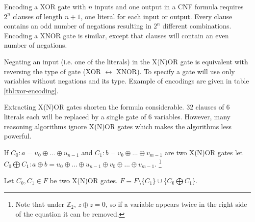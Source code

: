 Encoding a XOR gate with $n$ inputs and one output in a CNF
formula requires $2^n$ clauses of length $n + 1$, one literal
for each input or output.  Every clause contains an odd number of
negations resulting in $2^n$ different combinations. Encoding a
XNOR gate is similar, except that clauses will contain an even
number of negations.


Negating an input (i.e. one of the literals) in the X(N)OR gate is
equivalent with reversing the type of gate (XOR $\leftrightarrow$
XNOR). To specify a gate will use only variables without
negations and its type.  Example of encodings are given in table
\ref{tbl:xor-encoding}.

Extracting X(N)OR gates shorten the formula considerable. 32
clauses of 6 literals each will be replaced by a single gate of 6
variables. However, many reasoning algorithms ignore X(N)OR gates
which makes the algorithms less powerful.

\begin{table}
  \centering

  \caption{Example of CNF encodings of XOR and XNOR gates}
  \label{tbl:xor-encoding}
\end{table}



\begin{mydef}
  If $C_0: a = u_0 \oplus \ldots \oplus u_{n-1}$ and $C_1: b =
  v_0 \oplus \ldots \oplus v_{m-1}$ are two X(N)OR gates let $C_0
  \bigoplus C_1: a \oplus b = u_0 \oplus \ldots \oplus u_{n-1}
  \oplus v_0 \oplus \ldots \oplus v_{m-1}$. \footnote{Note that
  under $\mathbb{Z}_2$, $z \oplus z = 0$, so if a variable appears
  twice in the right side of the equation it can be removed.}
\end{mydef}

\begin{myprop}
  \label{myprop:xor-sum}
  Let $C_0, C_1 \in F$ be two X(N)OR gates. $F \equiv F \setminus \{C_1\} \cup
  \{C_0 \bigoplus C_1\}$.
\end{myprop}

